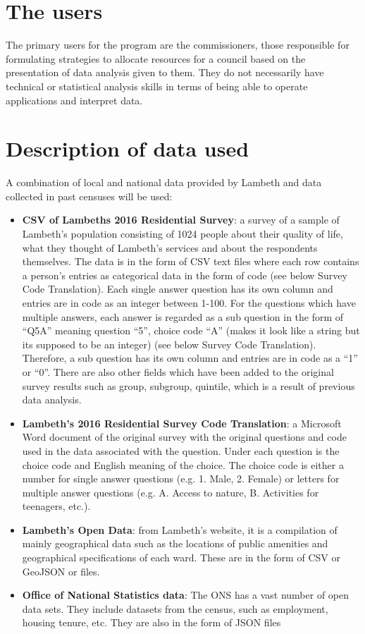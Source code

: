 \section{The users}
The primary users for the program are the commissioners, those responsible for formulating strategies to allocate resources for a council based on the presentation of data analysis given to them. They do not necessarily have technical or statistical analysis skills in terms of being able to operate applications and interpret data.


\section{Description of data used}
A combination of local and national data provided by Lambeth and data collected in past censuses will be used:

\begin{itemize}
  \item \textbf{CSV of Lambeth\textquotesingle s 2016 Residential Survey}: a survey of a sample of Lambeth’s population consisting of 1024 people about their quality of life, what they thought of Lambeth’s services and about the respondents themselves. The data is in the form of CSV text files where each row contains a person’s entries as categorical data in the form of code (see below Survey Code Translation). Each single answer question has its own column and entries are in code as an integer between 1-100. For the questions which have multiple answers, each answer is regarded as a sub question in the form of “Q5A” meaning question “5”, choice code “A” (makes it look like a string but its supposed to be an integer) (see below Survey Code Translation). Therefore, a sub question has its own column and entries are in code as a “1” or “0”. There are also other fields which have been added to the original survey results such as group, subgroup, quintile, which is a result of previous data analysis.
  \item \textbf{Lambeth’s 2016 Residential Survey Code Translation}: a Microsoft Word document of the original survey with the original questions and code used in the data associated with the question. Under each question is the choice code and English meaning of the choice. The choice code is either a number for single answer questions (e.g. 1. Male, 2. Female) or letters for multiple answer questions (e.g. A. Access to nature, B. Activities for teenagers, etc.).
  \item \textbf{Lambeth’s Open Data}: from Lambeth’s website, it is a compilation of mainly geographical data such as the locations of public amenities and geographical specifications of each ward. These are in the form of CSV or GeoJSON or files.
  \item \textbf{Office of National Statistics data}: The ONS has a vast number of open data sets. They include datasets from the census, such as employment, housing tenure, etc. They are also in the form of JSON files
\end{itemize}

